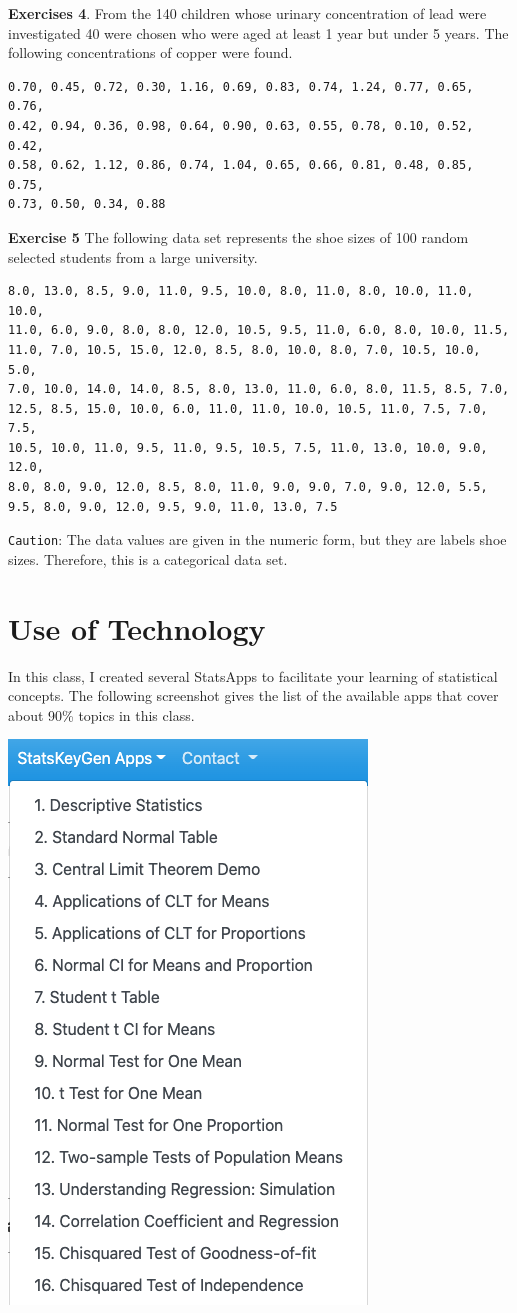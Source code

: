 \documentclass[
]{book}
\begin{document}
\textbf{Exercises 4}. From the 140 children whose urinary concentration of lead were investigated 40 were chosen who were aged at least 1 year but under 5 years. The following concentrations of copper were found.

\begin{verbatim}
0.70, 0.45, 0.72, 0.30, 1.16, 0.69, 0.83, 0.74, 1.24, 0.77, 0.65, 0.76, 
0.42, 0.94, 0.36, 0.98, 0.64, 0.90, 0.63, 0.55, 0.78, 0.10, 0.52, 0.42,
0.58, 0.62, 1.12, 0.86, 0.74, 1.04, 0.65, 0.66, 0.81, 0.48, 0.85, 0.75, 
0.73, 0.50, 0.34, 0.88
\end{verbatim}

\textbf{Exercise 5} The following data set represents the shoe sizes of 100 random selected students from a large university.

\begin{verbatim}
8.0, 13.0, 8.5, 9.0, 11.0, 9.5, 10.0, 8.0, 11.0, 8.0, 10.0, 11.0, 10.0, 
11.0, 6.0, 9.0, 8.0, 8.0, 12.0, 10.5, 9.5, 11.0, 6.0, 8.0, 10.0, 11.5, 
11.0, 7.0, 10.5, 15.0, 12.0, 8.5, 8.0, 10.0, 8.0, 7.0, 10.5, 10.0, 5.0, 
7.0, 10.0, 14.0, 14.0, 8.5, 8.0, 13.0, 11.0, 6.0, 8.0, 11.5, 8.5, 7.0, 
12.5, 8.5, 15.0, 10.0, 6.0, 11.0, 11.0, 10.0, 10.5, 11.0, 7.5, 7.0, 7.5, 
10.5, 10.0, 11.0, 9.5, 11.0, 9.5, 10.5, 7.5, 11.0, 13.0, 10.0, 9.0, 12.0, 
8.0, 8.0, 9.0, 12.0, 8.5, 8.0, 11.0, 9.0, 9.0, 7.0, 9.0, 12.0, 5.5,
9.5, 8.0, 9.0, 12.0, 9.5, 9.0, 11.0, 13.0, 7.5
\end{verbatim}

\texttt{Caution}: The data values are given in the numeric form, but they are labels shoe sizes. Therefore, this is a categorical data set.

\hypertarget{use-of-technology}{%
\section{Use of Technology}\label{use-of-technology}}

In this class, I created several StatsApps to facilitate your learning of statistical concepts. The following screenshot gives the list of the available apps that cover about 90\% topics in this class.

\begin{center}\includegraphics[width=0.3\linewidth]{week01/listApps} \end{center}
\end{document}

